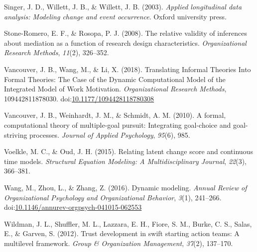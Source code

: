 \documentclass[english,,man]{apa6}
\theoremstyle{definition}
\theoremstyle{definition}
\theoremstyle{definition}
\theoremstyle{remark}
\begin{document}
\leavevmode\hypertarget{ref-singer_applied_2003}{}%
Singer, J. D., Willett, J. B., \& Willett, J. B. (2003). \emph{Applied
longitudinal data analysis: Modeling change and event occurrence}.
Oxford university press.

\leavevmode\hypertarget{ref-stone2008relative}{}%
Stone-Romero, E. F., \& Rosopa, P. J. (2008). The relative validity of
inferences about mediation as a function of research design
characteristics. \emph{Organizational Research Methods}, \emph{11}(2),
326--352.

\leavevmode\hypertarget{ref-vancouver_translating_2018}{}%
Vancouver, J. B., Wang, M., \& Li, X. (2018). Translating Informal
Theories Into Formal Theories: The Case of the Dynamic Computational
Model of the Integrated Model of Work Motivation. \emph{Organizational
Research Methods}, 109442811878030.
doi:\href{https://doi.org/10.1177/1094428118780308}{10.1177/1094428118780308}

\leavevmode\hypertarget{ref-vancouver2010formal}{}%
Vancouver, J. B., Weinhardt, J. M., \& Schmidt, A. M. (2010). A formal,
computational theory of multiple-goal pursuit: Integrating goal-choice
and goal-striving processes. \emph{Journal of Applied Psychology},
\emph{95}(6), 985.

\leavevmode\hypertarget{ref-voelkle2015relating}{}%
Voelkle, M. C., \& Oud, J. H. (2015). Relating latent change score and
continuous time models. \emph{Structural Equation Modeling: A
Multidisciplinary Journal}, \emph{22}(3), 366--381.

\leavevmode\hypertarget{ref-Wang2016}{}%
Wang, M., Zhou, L., \& Zhang, Z. (2016). Dynamic modeling. \emph{Annual
Review of Organizational Psychology and Organizational Behavior},
\emph{3}(1), 241--266.
doi:\href{https://doi.org/10.1146/annurev-orgpsych-041015-062553}{10.1146/annurev-orgpsych-041015-062553}

\leavevmode\hypertarget{ref-wildman2012trust}{}%
Wildman, J. L., Shuffler, M. L., Lazzara, E. H., Fiore, S. M., Burke, C.
S., Salas, E., \& Garven, S. (2012). Trust development in swift starting
action teams: A multilevel framework. \emph{Group \& Organization
Management}, \emph{37}(2), 137--170.
\end{document}
